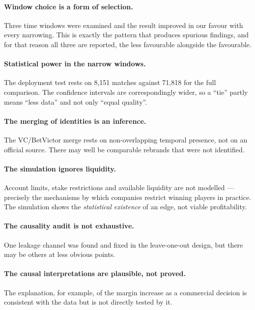 \documentclass[12pt,a4paper,oneside]{report}
\renewcommand{\_}{\oldunderscore\allowbreak}
\theoremstyle{definition}
\theoremstyle{plain}
\theoremstyle{remark}
\begin{document}
\paragraph{Window choice is a form of selection.} Three time windows were examined and the result
improved in our favour with every narrowing. This is exactly the pattern that produces spurious
findings, and for that reason all three are reported, the less favourable alongside the
favourable.

\paragraph{Statistical power in the narrow windows.} The deployment test rests on 8,151 matches
against 71,818 for the full comparison. The confidence intervals are correspondingly wider, so a
``tie'' partly means ``less data'' and not only ``equal quality''.

\paragraph{The merging of identities is an inference.} The VC/BetVictor merge rests on
non-overlapping temporal presence, not on an official source. There may well be comparable
rebrands that were not identified.

\paragraph{The simulation ignores liquidity.} Account limits, stake restrictions and available
liquidity are not modelled --- precisely the mechanisms by which companies restrict winning
players in practice. The simulation shows the \emph{statistical existence} of an edge, not viable
profitability.

\paragraph{The causality audit is not exhaustive.} One leakage channel was found and fixed in the
leave-one-out design, but there may be others at less obvious points.

\paragraph{The causal interpretations are plausible, not proved.} The explanation, for example, of
the margin increase as a commercial decision is consistent with the data but is not directly
tested by it.
\end{document}

